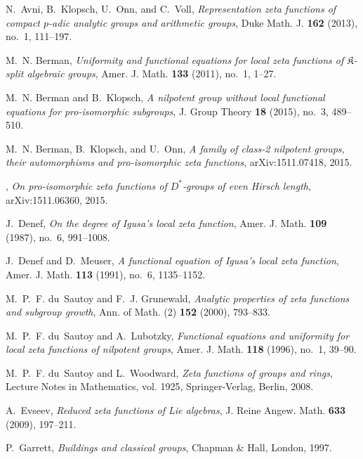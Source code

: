 \documentclass[11pt]{amsart}
\numberwithin{equation}{section}
\numberwithin{figure}{section}
\theoremstyle{plain}
\theoremstyle{definition}
\theoremstyle{remark}
\begin{document}
\begin{thebibliography}{10}

N.~Avni, B.~Klopsch, U.~Onn, and C.~Voll, \emph{Representation zeta functions
  of compact {$p$}-adic analytic groups and arithmetic groups}, Duke Math. J.
  \textbf{162} (2013), no.~1, 111--197.

M.~N. Berman, \emph{Uniformity and functional equations for local zeta
  functions of $\mathfrak{K}$-split algebraic groups}, Amer. J. Math.
  \textbf{133} (2011), no.~1, 1--27.

M.~N. Berman and B.~Klopsch, \emph{A nilpotent group without local functional
  equations for pro-isomorphic subgroups}, J. Group Theory \textbf{18} (2015),
  no.~3, 489--510.

M.~N. Berman, B.~Klopsch, and U.~Onn, \emph{A family of class-2 nilpotent
  groups, their automorphisms and pro-isomorphic zeta functions},
  arXiv:1511.07418, 2015.

\bysame, \emph{{On pro-isomorphic zeta functions of $D^*$-groups of even Hirsch
  length}}, arXiv:1511.06360, 2015.

J.~Denef, \emph{{On the degree of Igusa's local zeta function}}, Amer. J. Math.
  \textbf{109} (1987), no.~6, 991--1008.

J.~Denef and D.~Meuser, \emph{{A functional equation of Igusa's local zeta
  function}}, Amer. J. Math. \textbf{113} (1991), no.~6, 1135--1152.

M.~P.~F. du~Sautoy and F.~J. Grunewald, \emph{Analytic properties of zeta
  functions and subgroup growth}, Ann. of Math. (2) \textbf{152} (2000),
  793--833.

M.~P.~F. du~Sautoy and A.~Lubotzky, \emph{Functional equations and uniformity
  for local zeta functions of nilpotent groups}, Amer. J. Math. \textbf{118}
  (1996), no.~1, 39--90.

M.~P.~F. du~Sautoy and L.~Woodward, \emph{Zeta functions of groups and rings},
  Lecture Notes in Mathematics, vol. 1925, Springer-Verlag, Berlin, 2008.

A.~Evseev, \emph{Reduced zeta functions of {L}ie algebras}, J. Reine Angew.
  Math. \textbf{633} (2009), 197--211.

P.~Garrett, \emph{Buildings and classical groups}, Chapman \& Hall, London,
  1997.


\end{thebibliography}
\end{document}
